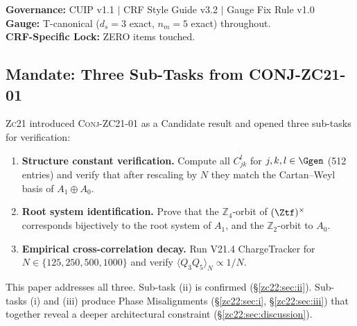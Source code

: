 \documentclass[12pt, a4paper]{article}
\begin{document}
\vspace{0.5em}
\begin{center}
\small\color{mutedgray}
\textbf{Governance:} CUIP v1.1 \quad$|$\quad
CRF Style Guide v3.2 \quad$|$\quad
Gauge Fix Rule v1.0\\[2pt]
\textbf{Gauge:} T-canonical ($d_s = 3$ exact, $n_m = 5$ exact) throughout.\\[2pt]
\textbf{CRF-Specific Lock:} ZERO items touched.
\end{center}

\tableofcontents
\newpage

\subsection{Mandate: Three Sub-Tasks from CONJ-ZC21-01}
\label{zc22:sec:mandate}

\textsc{Zc21} introduced \textsc{Conj-ZC21-01} as a Candidate result
and opened three sub-tasks for verification:

\begin{openqbox}[title={Sub-Tasks Inherited from ZC21 (GAP-ZC21-00)}]
\begin{enumerate}[leftmargin=*, label=(\roman*), noitemsep]
  \item \textbf{Structure constant verification.}
    Compute all $C^l_{jk}$ for $j,k,l \in \Ggen$ (512 entries)
    and verify that after rescaling by $N$ they match
    the Cartan--Weyl basis of $A_1 \oplus A_0$.
  \item \textbf{Root system identification.}
    Prove that the $\mathbb{Z}_4$-orbit of $(\Ztf)^\times$
    corresponds bijectively to the root system of $A_1$,
    and the $\mathbb{Z}_2$-orbit to $A_0$.
  \item \textbf{Empirical cross-correlation decay.}
    Run V21.4 ChargeTracker for $N \in \{125, 250, 500, 1000\}$
    and verify $\langle Q_3 Q_5\rangle_N \propto 1/N$.
\end{enumerate}
\end{openqbox}

This paper addresses all three.
Sub-task (ii) is confirmed (\S\ref{zc22:sec:ii}).
Sub-tasks (i) and (iii) produce Phase Misalignments
(\S\ref{zc22:sec:i}, \S\ref{zc22:sec:iii}) that together
reveal a deeper architectural constraint (\S\ref{zc22:sec:discussion}).

\end{document}
